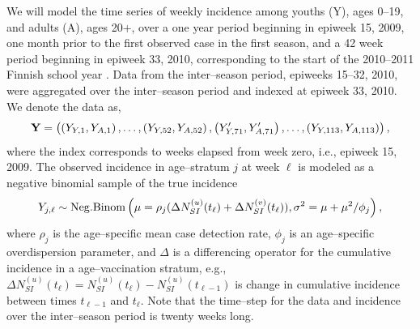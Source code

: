 We will model the time series of weekly incidence among youths (Y), ages 0--19, and adults (A), ages 20+, over a one year period beginning in epiweek 15, 2009, one month prior to the first observed case in the first season, and a 42 week period beginning in epiweek 33, 2010, corresponding to the start of the 2010--2011 Finnish school year \cite{calendarFinland}. Data from the inter--season period, epiweeks 15--32, 2010, were aggregated over the inter--season period and indexed at epiweek 33, 2010. We denote the data as, $$ \mathbf{Y} = \left (\left (Y_{Y,1},Y_{A,1}\right ),\dots,\left (Y_{Y,52},Y_{A,52}\right ),\left (Y^\prime_{Y,71},Y^\prime_{A,71}\right ),\dots,\left (Y_{Y,113},Y_{A,113}\right )\right ), $$ where the index corresponds to weeks elapsed from week zero, i.e., epiweek 15, 2009. The observed incidence in age--stratum $ j $ at week $ \ell $ is modeled as a negative binomial sample of the true incidence \begin{equation}
\label{flu_emit_prob}
Y_{j,\ell} \sim \mathrm{Neg.Binom}\left (\mu = \rho_j(\Delta N_{SI}^{(u)}(t_\ell) + \Delta N_{SI}^{(v)}(t_\ell)), \sigma^2 = \mu + \mu^2 / \phi_j\right ),
\end{equation}
where $ \rho_j $ is the age--specific mean case detection rate, $ \phi_j $ is an age--specific overdispersion parameter, and $ \Delta $ is a differencing operator for the cumulative incidence in a age--vaccination stratum, e.g., $ \Delta N_{SI}^{(u)}(t_\ell) = N_{SI}^{(u)}(t_\ell) - N_{SI}^{(u)}(t_{\ell-1}) $ is change in cumulative incidence between times $ t_{\ell-1} $ and $ t_\ell $. Note that the time--step for the data and incidence over the inter--season period is twenty weeks long. 


